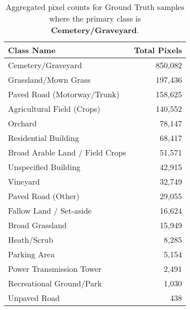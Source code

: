 \begin{table}[H] %
    \centering
    \caption{Aggregated pixel counts for Ground Truth samples where the primary class is \textbf{Cemetery/Graveyard}.}
    \label{tab:gt_counts_32}
    \begin{tabular}{lr}
        \hline
        \textbf{Class Name} & \textbf{Total Pixels} \\
        \hline
        Cemetery/Graveyard & 850,082 \\
        Grassland/Mown Grass & 197,436 \\
        Paved Road (Motorway/Trunk) & 158,625 \\
        Agricultural Field (Crops) & 140,552 \\
        Orchard & 78,147 \\
        Residential Building & 68,417 \\
        Broad Arable Land / Field Crops & 51,571 \\
        Unspecified Building & 42,915 \\
        Vineyard & 32,749 \\
        Paved Road (Other) & 29,055 \\
        Fallow Land / Set-aside & 16,624 \\
        Broad Grassland & 15,949 \\
        Heath/Scrub & 8,285 \\
        Parking Area & 5,154 \\
        Power Transmission Tower & 2,491 \\
        Recreational Ground/Park & 1,030 \\
        Unpaved Road & 438 \\
        \hline
    \end{tabular}
\end{table}

